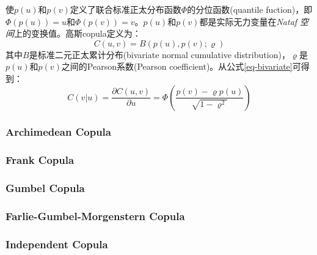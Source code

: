 使$p(u)$和$p(v)$定义了联合标准正太分布函数$\Phi$的\textcolor[rgb]{1,0,0}{分位函数(quantile fuction)}，即$\Phi(p(u)) = u$和$\Phi(p(v))=v$。$p(u)$和$p(v)$都是实际无力变量在\emph{Nataf 空间}上的变换值。高斯copula定义为：
\begin{equation}
    \label{eq-gaussiancopula}
    C(u,v) = B(p(u),p(v);\varrho)
\end{equation}
其中$B$是标准二元正太累计分布(bivariate normal cumulative distribution)，$\varrho$是$p(u)$和$p(v)$之间的Pearson系数(Pearson coefficient)。从公式\ref{eq-bivariate}可得到：
\begin{equation} 
    \label{eq-copula-bivariate}
    C(v|u) = \dfrac{\partial C(u,v)}{\partial u} = \Phi \left(\dfrac{p(v)-\varrho p(u)}{\sqrt{1-\varrho^{2}}}\right)
\end{equation} 

\subsubsection{Archimedean Copula}
\subsubsection{Frank Copula}
\subsubsection{Gumbel Copula}
\subsubsection{Farlie-Gumbel-Morgenstern  Copula}
\subsubsection{Independent Copula}
